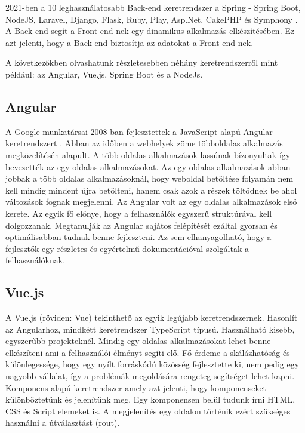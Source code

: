 2021-ben a 10 leghasználatosabb Back-end keretrendszer a Spring - Spring Boot, NodeJS, Laravel, Django, Flask, Ruby, Play, Asp.Net, CakePHP és Symphony \cite{backendframework1}\cite{backendframework2}. A Back-end segít a Front-end-nek egy dinamikus alkalmazás elkészítésében. Ez azt jelenti, hogy a Back-end biztosítja az adatokat a Front-end-nek.

A következőkben olvashatunk részletesebben néhány keretrendszerről mint például: az Angular, Vue.js, Spring Boot és a NodeJs.

\subsection{Angular}
A Google munkatársai 2008-ban fejlesztettek a JavaScript alapú Angular keretrendszert \cite{wohlgethan2018supportingweb}. Abban az időben a webhelyek zöme többoldalas alkalmazás megközelítésén alapult. A több oldalas alkalmazások lassúnak bízonyultak így bevezették az egy oldalas alkalmazásokat. Az egy oldalas alkalmazások abban jobbak a több oldalas alkalmazásoknál, hogy weboldal betöltése folyamán nem kell mindig mindent újra betölteni, hanem csak azok a részek töltődnek be ahol változások fognak megjelenni. Az Angular volt az egy oldalas alkalmazások első kerete. Az egyik fő előnye, hogy a felhasználók egyszerű struktúrával kell dolgozzanak. Megtanulják az Angular sajátos felépítését ezáltal gyorsan és optimálisabban tudnak benne fejleszteni. Az sem elhanyagolható, hogy a fejlesztők egy részletes és egyértelmű dokumentációval szolgáltak a felhasználóknak.

\subsection{Vue.js}
A Vue.js (röviden: Vue) \cite{wohlgethan2018supportingweb} tekinthető az egyik legújabb keretrendszernek. Hasonlít az Angularhoz, mindkétt keretrendszer TypeScript típusú. Használható kisebb, egyszerűbb projekteknél. Mindig egy oldalas alkalmazásokat lehet benne elkészíteni ami a felhasználói élményt segíti elő. Fő érdeme a skálázhatóság és különlegessége, hogy egy nyílt forráskódú közösség fejlesztette ki, nem pedig egy nagyobb vállalat, így a problémák megoldására rengeteg segítséget lehet kapni. Komponens alapú keretrendszer amely azt jelenti, hogy komponenseket különböztetünk és jelenítünk meg. Egy komponensen belül tudunk írni HTML, CSS és Script elemeket is. A megjelenítés egy oldalon történik ezért szükséges használni a útválasztást (rout).
	
